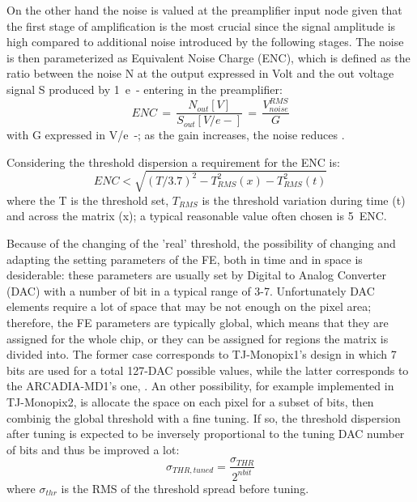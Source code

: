         On the other hand the noise is valued at the preamplifier input node given that the first stage of amplification is the most crucial since the signal amplitude is high compared to additional noise introduced by the following stages.
        The noise is then parameterized as Equivalent Noise Charge (ENC), which is defined as the ratio between the noise N at the output expressed in Volt and the out voltage signal S produced by \SI{1}{e-} entering in the preamplifier:
        \begin{equation}
            ENC\, =\, \frac{N_{out}[V]}{S_{out}[V/e-]}\,=\,\frac{V^{RMS} _{noise}}{G}
        \end{equation} 
        with G expressed in \si{V/e-}; as the gain increases, the noise reduces . 

        Considering the threshold dispersion a requirement for the ENC is: 
        \begin{equation}
            ENC < \sqrt{(T/3.7)^2 - T_{RMS} ^2 (x) - T_{RMS} ^2 (t)}
        \end{equation}
        where the T is the threshold set, $T_{RMS}$ is the threshold variation during time (t) and across the matrix (x); a typical reasonable value often chosen is \SI{5}{ENC}.

        Because of the changing of the 'real' threshold, the possibility of changing and adapting the setting parameters of the FE, both in time and in space is desiderable: these parameters are usually set by Digital to Analog Converter (DAC) with a number of bit in a typical range of 3-7.
        Unfortunately DAC elements require a lot of space that may be not enough on the pixel area; therefore, the FE parameters are typically global, which means that they are assigned for the whole chip, or they can be assigned for regions the matrix is divided into. 
        The former case corresponds to TJ-Monopix1's design in which 7 bits are used for a total 127-DAC possible values, while the latter corresponds to the ARCADIA-MD1's one, . 
        An other possibility, for example implemented in TJ-Monopix2, is allocate the space on each pixel for a subset of bits, then combinig the global threshold with a fine tuning. 
        If so, the threshold dispersion after tuning is expected to be inversely proportional to the tuning DAC number of bits and thus be improved a lot:
        \begin{equation}
            \sigma_{THR, tuned} = \frac{\sigma_{THR}}{2^{n bit}}
        \end{equation}    
        where $\sigma_{thr}$ is the RMS of the threshold spread before tuning.

